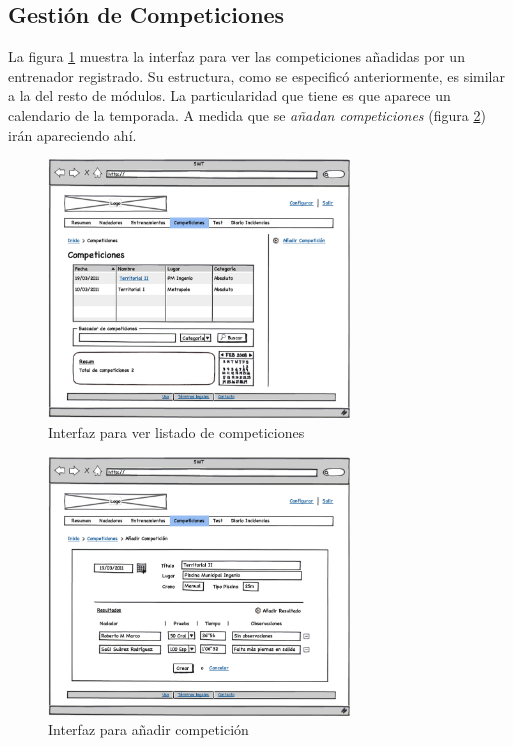 	\subsection{Gestión de Competiciones} %
		\label{sub:gestion_de_competiciones}
	
	La figura \ref{fig:interfaz_competiciones} muestra la interfaz para ver las competiciones añadidas por un entrenador registrado. Su estructura, como se especificó anteriormente, es similar a la del resto de módulos. La particularidad que tiene es que aparece un calendario de la temporada. A medida que se {\it añadan competiciones} (figura \ref{fig:interfaz_competiciones_new}) irán apareciendo ahí. 
	
		\begin{figure}[H]
		  \centering
		    \includegraphics[width=8cm]{./eps/p_interfaz/14_Competiciones.eps}
		  \caption{Interfaz para ver listado de competiciones}
		  \label{fig:interfaz_competiciones}
		\end{figure}

		\begin{figure}[H]
		  \centering
		    \includegraphics[width=8cm]{./eps/p_interfaz/15_Competiciones_new.eps}
		  \caption{Interfaz para añadir competición}
		  \label{fig:interfaz_competiciones_new}
		\end{figure}

